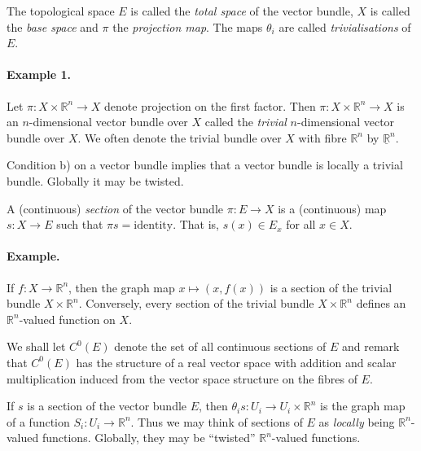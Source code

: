 The topological space $E$ is called the \emph{total space} of the vector bundle, $X$ is called the \emph{base space} and $\pi$ the \emph{projection map}. The maps $\theta_i$ are called \emph{trivialisations} of $E$.

\paragraph*{Example 1.} Let $\pi:X\times\mathbb R^n\to X$ denote projection on the first factor. Then $\pi:X\times\mathbb R^n\to X$ is an $n$-dimensional vector bundle over $X$ called the \emph{trivial} $n$-dimensional vector bundle over $X$. We often denote the trivial bundle over $X$ with fibre $\mathbb R^n$ by $\underline{\mathbb R}^n$.

Condition b) on a vector bundle implies that a vector bundle is locally a trivial bundle. Globally it may be twisted.

 A (continuous) \emph{section} of the vector bundle $\pi:E\to X$ is a (continuous) map $s:X\to E$ such that $\pi s=\text{identity}$. That is, $s(x)\in E_x$ for all $x\in X$.

\paragraph*{Example.} If $f:X\to\mathbb R^n$, then the graph map $x\mapsto(x,f(x))$ is a section of the trivial bundle $X\times\mathbb R^n$. Conversely, every section of the trivial bundle $X\times\mathbb R^n$ defines an $\mathbb R^n$-valued function on $X$.

We shall let $C^0(E)$ denote the set of all continuous sections of $E$ and remark that $C^0(E)$ has the structure of a real vector space with addition and scalar multiplication induced from the vector space structure on the fibres of $E$.

If $s$ is a section of the vector bundle $E$, then $\theta_i s:U_i\to U_i\times\mathbb R^n$ is the graph map of a function $S_i:U_i\to\mathbb R^n$. Thus we may think of sections of $E$ as \emph{locally} being $\mathbb R^n$-valued functions. Globally, they may be ``twisted'' $\mathbb R^n$-valued functions.
